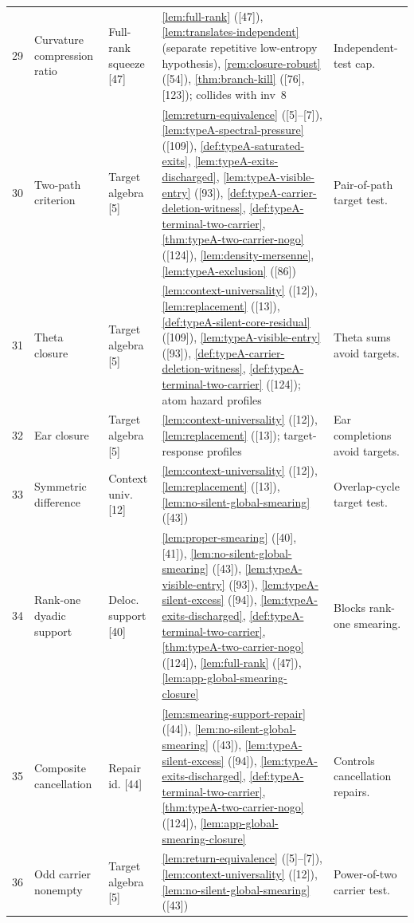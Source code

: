 \documentclass[11pt]{article}
\begin{document}
{\begin{longtable}{C{0.032\textwidth} L{0.145\textwidth} L{0.105\textwidth} L{0.50\textwidth} L{0.155\textwidth}}
29 & Curvature compression ratio & Full-rank squeeze {[47]} & \cref{lem:full-rank} ([47]), \cref{lem:translates-independent} (separate repetitive low-entropy hypothesis), \cref{rem:closure-robust} ([54]), \cref{thm:branch-kill} ([76], [123]); collides with inv~8 & Independent-test cap. \\
30 & Two-path criterion & Target algebra {[5]} & \cref{lem:return-equivalence} ([5]--[7]), \cref{lem:typeA-spectral-pressure} ([109]), \cref{def:typeA-saturated-exits}, \cref{lem:typeA-exits-discharged}, \cref{lem:typeA-visible-entry} ([93]), \cref{def:typeA-carrier-deletion-witness}, \cref{def:typeA-terminal-two-carrier}, \cref{thm:typeA-two-carrier-nogo} ([124]), \cref{lem:density-mersenne}, \cref{lem:typeA-exclusion} ([86]) & Pair-of-path target test. \\
31 & Theta closure & Target algebra {[5]} & \cref{lem:context-universality} ([12]), \cref{lem:replacement} ([13]), \cref{def:typeA-silent-core-residual} ([109]), \cref{lem:typeA-visible-entry} ([93]), \cref{def:typeA-carrier-deletion-witness}, \cref{def:typeA-terminal-two-carrier} ([124]); atom hazard profiles & Theta sums avoid targets. \\
32 & Ear closure & Target algebra {[5]} & \cref{lem:context-universality} ([12]), \cref{lem:replacement} ([13]); target-response profiles & Ear completions avoid targets. \\
33 & Symmetric difference & Context univ. {[12]} & \cref{lem:context-universality} ([12]), \cref{lem:replacement} ([13]), \cref{lem:no-silent-global-smearing} ([43]) & Overlap-cycle target test. \\
34 & Rank-one dyadic support & Deloc. support {[40]} & \cref{lem:proper-smearing} ([40], [41]), \cref{lem:no-silent-global-smearing} ([43]), \cref{lem:typeA-visible-entry} ([93]), \cref{lem:typeA-silent-excess} ([94]), \cref{lem:typeA-exits-discharged}, \cref{def:typeA-terminal-two-carrier}, \cref{thm:typeA-two-carrier-nogo} ([124]), \cref{lem:full-rank} ([47]), \cref{lem:app-global-smearing-closure} & Blocks rank-one smearing. \\
35 & Composite cancellation & Repair id. {[44]} & \cref{lem:smearing-support-repair} ([44]), \cref{lem:no-silent-global-smearing} ([43]), \cref{lem:typeA-silent-excess} ([94]), \cref{lem:typeA-exits-discharged}, \cref{def:typeA-terminal-two-carrier}, \cref{thm:typeA-two-carrier-nogo} ([124]), \cref{lem:app-global-smearing-closure} & Controls cancellation repairs. \\
36 & Odd carrier nonempty & Target algebra {[5]} & \cref{lem:return-equivalence} ([5]--[7]), \cref{lem:context-universality} ([12]), \cref{lem:no-silent-global-smearing} ([43]) & Power-of-two carrier test. \\

\end{longtable}}
\end{document}
